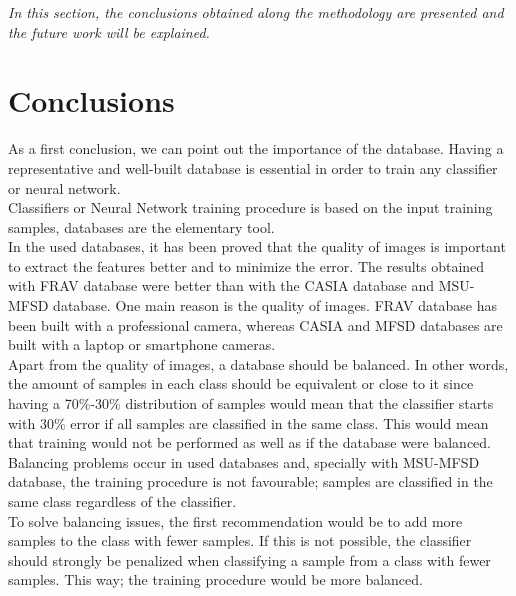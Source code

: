 
\begin{small}
\emph{In this section, the conclusions obtained along the methodology are presented and the future work will be explained.}
\end{small}

\section{Conclusions}
As a first conclusion,  we can point out the importance of the database. Having a representative and well-built database is essential in order to train any classifier or neural network.\\

Classifiers or Neural Network training procedure is based on the input training samples, databases are the elementary tool.\\

In the used databases, it has been proved that the quality of images is important to extract the features better and to minimize the error. The results obtained with FRAV database were better than with the CASIA database and MSU-MFSD database. One main reason is the quality of images. FRAV database has been built with a professional camera, whereas CASIA and MFSD databases are built with a laptop or smartphone cameras.\\

Apart from the quality of images, a database should be balanced. In other words, the amount of samples in each class should be equivalent or close to it since having a 70\%-30\%  distribution of samples would mean that the classifier starts with 30\% error if all samples are classified in the same class. This would mean that training would not be performed as well as if the database were balanced.\\

Balancing problems occur in used databases and, specially with MSU-MFSD database, the training procedure is not favourable; samples are classified in the same class regardless of the classifier.\\

To solve balancing issues, the first recommendation would be to add more samples to the class with fewer samples. If this is not possible, the classifier should strongly be penalized when classifying a sample from a class with fewer samples. This way; the training procedure would be more balanced.\\

